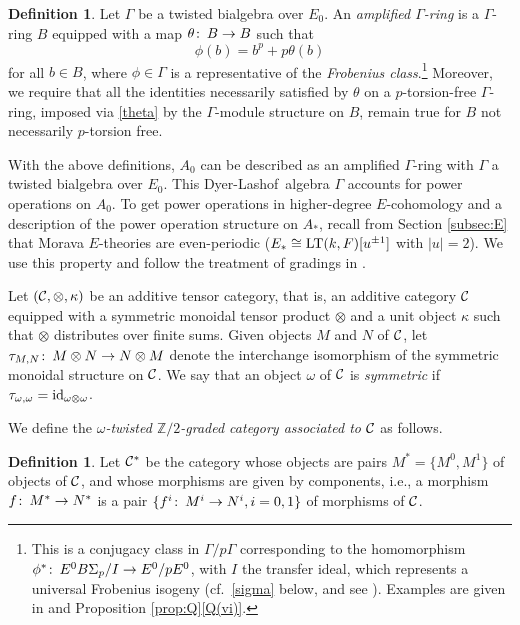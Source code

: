 \documentclass{gtpart}
\theoremstyle{definition}
\newtheorem{defn}[thm]{Definition}
\theoremstyle{remark}
\def\co{\colon\thinspace}
\newcommand{\mb}[1]{\mathbb{#1}}
\newcommand{\LT}{{\rm LT}}
\newcommand{\CC}{{\cal C}}
\newcommand{\DL}{Dyer-Lashof~}
\newcommand{\BZ}{{\mb Z}}
\newcommand{\id}{{\rm id}}
\newcommand{\G}{\Gamma}
\newcommand{\K}{\kappa}
\newcommand{\q}[1]{Proposition \ref{prop:Q}\thinspace \eqref{Q(#1)}}
\numberwithin{equation}{section}
\numberwithin{thm}{section}
\begin{document}
\begin{defn}
 Let $\G$ be a twisted bialgebra over $E_0$.  An {\em amplified 
 $\G$-ring} is a $\G$-ring $B$ equipped with a map $\theta \co B \to B$ 
 such that 
 \begin{equation}
 \label{theta}
  \phi (b) = b^p + p \theta (b) 
 \end{equation}
 for all $b \in B$, where $\phi \in \G$ is a representative of the 
 {\em Frobenius class}.\footnote{This is a conjugacy class in $\G/p\G$ 
 corresponding to the homomorphism 
 $\phi^* \co E^0 B\Sigma_p / I \to E^0 / p E^0$, with $I$ the transfer 
 ideal, which represents a universal Frobenius isogeny 
 (cf.~\eqref{sigma} below, and see \cite[10.3-5]{cong}).  Examples are 
 given in \cite[2.6]{h2p2} and \q{vi}.  }  Moreover, we require that all 
 the identities necessarily satisfied by $\theta$ on a $p$-torsion-free 
 $\G$-ring, imposed via \eqref{theta} by the $\G$-module structure on 
 $B$, remain true for $B$ not necessarily $p$-torsion free.  
\end{defn}

With the above definitions, $A_0$ can be described as an amplified 
$\G$-ring with $\G$ a twisted bialgebra over $E_0$.  This \DL algebra 
$\G$ accounts for power operations on $A_0$.  To get power operations in 
higher-degree $E$-cohomology and a description of the power operation 
structure on $A_*$, recall from Section \ref{subsec:E} that Morava 
$E$-theories are even-periodic ($E_* \cong \LT(k,F)[u^{\pm1}]$ with 
$|u| = 2$).  We use this property and follow the treatment of gradings 
in \cite[Section 2]{cong}.  

Let $(\CC, \otimes, \K)$ be an additive tensor category, that is, an 
additive category $\CC$ equipped with a symmetric monoidal tensor 
product $\otimes$ and a unit object $\K$ such that $\otimes$ distributes 
over finite sums.  Given objects $M$ and $N$ of $\CC$, let 
$\tau_{M,N} \co M \otimes N \to N \otimes M$ denote the interchange 
isomorphism of the symmetric monoidal structure on $\CC$.  We say that 
an object $\omega$ of $\CC$ is {\em symmetric} if 
$\tau_{\omega,\omega} = \id_{\omega \otimes \omega}$.  

We define the {\em $\omega$-twisted $\BZ/2$-graded category associated 
to $\CC$} as follows.  

\begin{defn}
 Let $\CC^*$ be the category whose objects are pairs 
 $M^* = \{ M^0, M^1 \}$ of objects of $\CC$, and whose morphisms are 
 given by components, i.e., a morphism $f \co M^* \to N^*$ is a pair 
 $\{ f^i \co M^i \to N^i, i = 0, 1 \}$ of morphisms of $\CC$.  
\end{defn}
\end{document}
